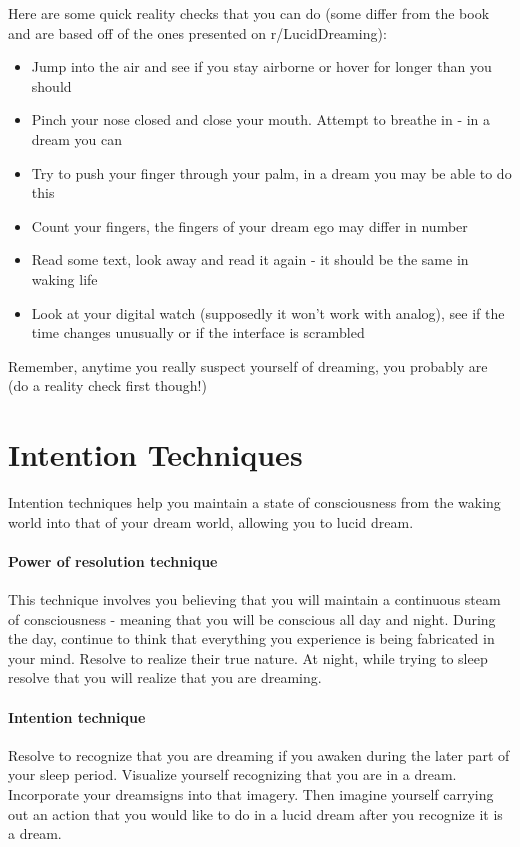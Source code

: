 \documentclass{report}
\begin{document}
Here are some quick reality checks that you can do (some differ from the book and are based off of the ones presented on r/LucidDreaming):
\begin{itemize}
  \item Jump into the air and see if you stay airborne or hover for longer than you should
  \item Pinch your nose closed and close your mouth. Attempt to breathe in - in a dream you can
  \item Try to push your finger through your palm, in a dream you may be able to do this
  \item Count your fingers, the fingers of your dream ego may differ in number
  \item Read some text, look away and read it again - it should be the same in waking life
  \item Look at your digital watch (supposedly it won't work with analog), see if the time changes unusually or if the interface is scrambled
\end{itemize}

Remember, anytime you really suspect yourself of dreaming, you probably are (do a reality check first though!)

\section{Intention Techniques}
Intention techniques help you maintain a state of consciousness from the waking world into that of your dream world, allowing you to lucid dream.

\paragraph{Power of resolution technique} This technique involves you believing that you will maintain a continuous steam of consciousness - meaning that you will be conscious all day and night. During the day, continue to think that everything you experience is being fabricated in your mind. Resolve to realize their true nature. At night, while trying to sleep resolve that you will realize that you are dreaming.

\paragraph{Intention technique} Resolve to recognize that you are dreaming if you awaken during the later part of your sleep period. Visualize yourself recognizing that you are in a dream. Incorporate your dreamsigns into that imagery. Then imagine yourself carrying out an action that you would like to do in a lucid dream after you recognize it is a dream.
\end{document}
